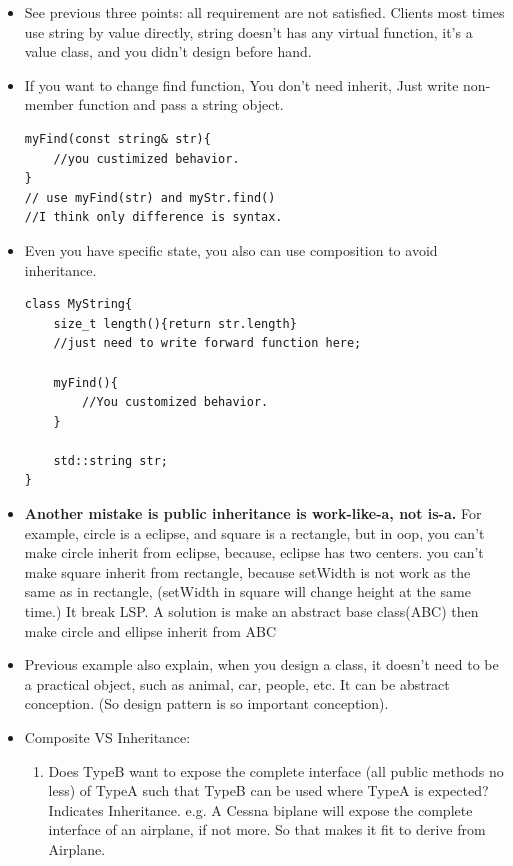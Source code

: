 \documentclass[a4paper,11pt,twoside]{book}
\begin{document}
\begin{itemize}
	\item See previous three points: all requirement are not satisfied. Clients most times use string by value directly, string doesn't has any virtual function, it's a value class, and you didn't design before hand.
	
\item If you want to change find function, You don't need inherit,  Just write non-member function and pass a string object.
\begin{lstlisting}[numbers=none]
myFind(const string& str){
	//you custimized behavior.
}
// use myFind(str) and myStr.find()
//I think only difference is syntax.
\end{lstlisting}
	
\item Even you have specific state, you also can use composition to avoid inheritance.
\begin{lstlisting}[numbers=none]
class MyString{
	size_t length(){return str.length}
	//just need to write forward function here;
	
	myFind(){
		//You customized behavior.
	}
	
	std::string str;
}
	\end{lstlisting}
	
	\item \textbf{Another mistake is public inheritance is work-like-a, not is-a.} For example, circle is a eclipse, and square is a rectangle, but in oop, you can't make circle inherit from eclipse, because, eclipse has two centers.  you can't make square inherit from rectangle, because setWidth is not work as the same as in rectangle, (setWidth in square will change height at the same time.) It break LSP.  A solution is make an abstract base class(ABC) then make circle and ellipse inherit from ABC
	
	
	\item Previous example also explain, when you design a class, it doesn't need to be a practical object, such as animal, car, people, etc.  It can be abstract conception.  (So design pattern is so important conception).
	
	\item Composite VS Inheritance:
	\begin{enumerate}
		\item Does TypeB want to expose the complete interface (all public methods no less) of TypeA such that TypeB can be used where TypeA is expected? Indicates Inheritance. e.g. A Cessna biplane will expose the complete interface of an airplane, if not more. So that makes it fit to derive from Airplane.
		

\end{enumerate}
\end{itemize}
\end{document}
